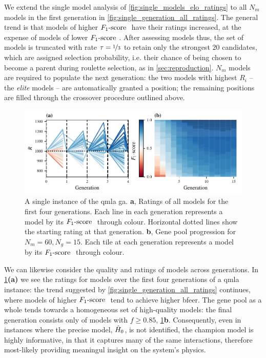 We extend the single model analysis of \cref{fig:single_models_elo_ratings} to all $N_m$ models 
    in the first generation in \cref{fig:single_generation_all_ratings}.
The general trend is that models of higher $ F_{1}\text{-score}  \ $ have their ratings increased, 
    at the expense of models of lower $ F_{1}\text{-score}  \ $. 
After assessing models thus, the set of models is truncated with rate $\tau=\nicefrac{1}{3}$ to retain only 
    the strongest $20$ candidates,
    which are assigned selection probability, i.e. their chance of being chosen to become a parent during roulette selection, 
    as in \cref{sec:reproduction}.
$N_m$ models are required to populate the next generation:
    the two models with highest $R_i$ -- the \emph{elite} models -- are automatically granted a position;
    the remaining positions are filled through the crossover procedure outlined above.

\par 
\begin{figure}
    \begin{center}
        \includegraphics{theoretical_study/figures/gen_alg_instance_combined.pdf}
    \end{center}
    \caption[Instance of QMLA genetic algorithm]{
        A single \gls{instance} of the \gls{qmla} \acrlong{ga}.
        \textbf{a}, Ratings of all models for the first four generations. 
        Each line in each generation represents a model by its $ F_{1}\text{-score}  \ $ through colour. 
        Horizontal dotted lines show the starting rating at that generation. 
        \textbf{b}, Gene pool progression for $N_m=60, N_g=15$. 
        Each tile at each generation represents a model by its $ F_{1}\text{-score}  \ $ through colour. 
        \figtableref
    }
    \label{fig:ga_instance}
\end{figure}

We can likewise consider the quality and ratings of models across generations.
In \cref{fig:ga_instance}\textbf{(a)} we see the ratings for models over the first 
    four generations of a \gls{qmla} \gls{instance}:
    the trend suggested by \cref{fig:single_generation_all_ratings} continues,
    where models of higher $ F_{1}\text{-score}  \ $ tend to achieve higher \gls{bfeer}.
The gene pool as a whole tends towards a homogeneous set of high-quality models:
    the final generation consists only of models with $f \geq 0.85$, \cref{fig:ga_instance}\textbf{b}. 
Consequently, even in \glspl{instance} where the precise model, $\hat{H}_0$, is not identified, the \gls{champion model}
    is highly informative, in that it captures many of the same interactions, 
    therefore most-likely providing meaningul insight on the system's physics. 

